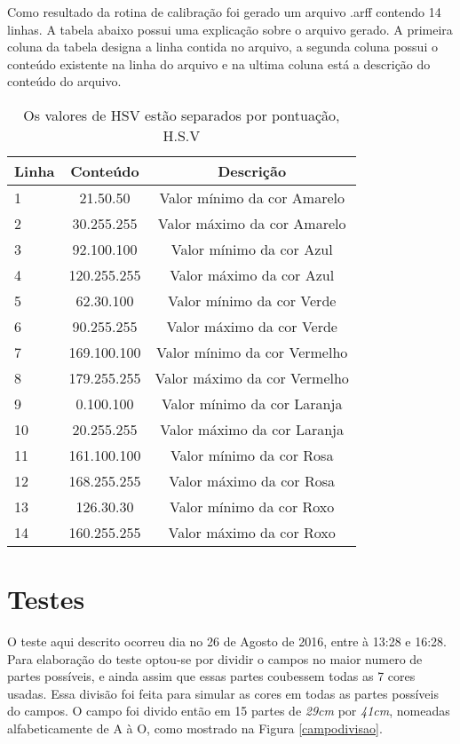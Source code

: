 Como resultado da rotina de calibração foi gerado um arquivo .arff contendo 14 linhas. A tabela abaixo possui uma explicação sobre o arquivo gerado. A primeira coluna da tabela designa a linha contida no arquivo, a segunda coluna possui o conteúdo existente na linha do arquivo e na ultima coluna está a descrição do conteúdo do arquivo.
	\begin{table}[H]
\centering 
\begin{tabular}{l|c|c}
Linha & Conteúdo & Descrição  \\%
\hline                               %
 1& 21.50.50  &   Valor mínimo da cor Amarelo \\ \hline  
2& 30.255.255  &  Valor máximo da cor Amarelo \\  \hline 
3& 92.100.100  &   Valor mínimo da cor Azul \\  \hline 
4& 120.255.255  &  Valor máximo da cor  Azul \\  \hline 
5& 62.30.100 &  Valor mínimo da cor Verde \\  \hline 
6& 90.255.255  &  Valor máximo da cor Verde \\  \hline 
7& 169.100.100  &  Valor mínimo da cor Vermelho \\  \hline 
8& 179.255.255  &  Valor máximo da cor Vermelho \\   \hline 
9& 0.100.100  &  Valor mínimo da cor Laranja \\  \hline 
10& 20.255.255 &  Valor máximo da cor  Laranja \\  \hline 
11& 161.100.100 &  Valor mínimo da cor Rosa \\  \hline 
12& 168.255.255 &   Valor máximo da cor Rosa \\  \hline 
13& 126.30.30 &  Valor mínimo da cor Roxo \\  \hline 
14& 160.255.255 &  Valor máximo da cor Roxo \\  \hline 

\end{tabular}
\caption{Os valores de HSV estão separados por pontuação, H.S.V}
\end{table}





 \section{Testes}
O teste aqui descrito ocorreu dia no 26 de Agosto de 2016, entre à 13:28 e 16:28.
Para elaboração do teste optou-se por dividir o campos no maior numero de partes possíveis, e ainda assim que essas partes coubessem todas as 7 cores usadas. Essa divisão foi feita para simular as cores em todas as partes possíveis do campos. O campo foi divido então em 15 partes de \textit{29cm} por \textit{41cm}, nomeadas alfabeticamente de A à O, como mostrado na Figura \ref{campodivisao}.

